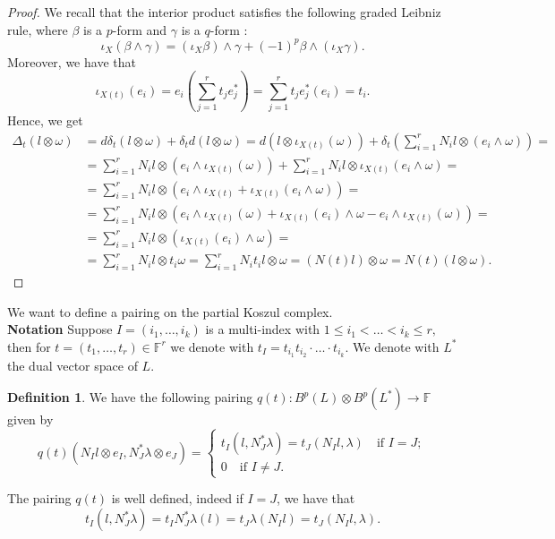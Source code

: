 \documentclass[a4paper,12 pt,titlepage,twoside]{book}
\newcommand{\numberset}{\mathbb}
\newcommand{\F}{\numberset{F}}
\theoremstyle{plain}
\theoremstyle{theorem}
\theoremstyle{definition}
\newtheorem{defn}[thm]{Definition}
\theoremstyle{remark}
\begin{document}
	\begin{proof}
		We recall that the interior product satisfies the following graded Leibniz rule, where $\beta$ is a $p$-form and $\gamma$ is a $q$-form : $$ \iota_X(\beta\wedge\gamma) = (\iota_X\beta)\wedge\gamma+(-1)^p\beta\wedge(\iota_X\gamma).$$ Moreover, we have that $$\iota_{X(t)}(e_i) = e_i\left(\sum_{j=1}^r t_j e_j^*\right) = \sum_{j=1}^r t_j e_j^*(e_i) = t_i.$$
		Hence, we get $$\begin{aligned}
		\Delta_t(l \otimes \omega) &= d \delta_t (l \otimes \omega) + \delta_t d (l \otimes \omega) = d (l \otimes \iota_{X(t)}(\omega)) + \delta_t\left(\sum_{i=1}^r N_il \otimes (e_i \wedge \omega)\right) = \\ &= \sum_{i=1}^r N_i l \otimes (e_i \wedge \iota_{X(t)}(\omega)) + \sum_{i=1}^r N_il \otimes \iota_{X(t)}(e_i \wedge \omega) =\\&= \sum_{i=1}^r N_i l \otimes \left(e_i \wedge \iota_{X(t)} + \iota_{X(t)}(e_i \wedge \omega)\right) =\\&= \sum_{i=1}^r N_il \otimes \left(e_i \wedge \iota_{X(t)}(\omega) + \iota_{X(t)}(e_i) \wedge \omega - e_i \wedge \iota_{X(t)}(\omega)\right) =\\&= \sum_{i=1}^r N_i l \otimes (\iota_{X(t)}(e_i) \wedge \omega) =\\&= \sum_{i=1}^r N_i l \otimes t_i \omega = \sum_{i=1}^r N_i t_i l \otimes \omega = (N(t) l )\otimes \omega = N(t)(l \otimes \omega).
		\end{aligned}$$
	\end{proof}
	We want to define a pairing on the partial Koszul complex. \\
	\textbf{Notation} Suppose $I=(i_1, \dots, i_k)$ is a multi-index with $1 \le i_1 < \dots <i_k \le r,$ then for $t= (t_1, \dots, t_r) \in \F^r$ we denote with $t_I= t_{i_1} t_{i_2} \cdot \dots \cdot t_{i_k}.$ We denote with $L^*$ the dual vector space of $L$.
	\begin{defn}
		We have the following pairing $q(t) \colon B^p(L) \otimes B^p(L^*) \rightarrow \F$ given by $$q(t)\left(N_I l\otimes e_I, N_J^* \lambda \otimes e_J\right) = \begin{cases} t_I(l, N_J^*\lambda)= t_J(N_Il, \lambda) \quad \text{if } I=J;\\ 0 \quad \text{if } I\neq J.\end{cases}$$
	\end{defn}
	The pairing $q(t)$ is well defined, indeed if $I=J$, we have that $$t_I(l, N_J^*\lambda) = t_IN_J^*\lambda(l) = t_J \lambda(N_I l) = t_J(N_I l , \lambda).$$
\end{document}
